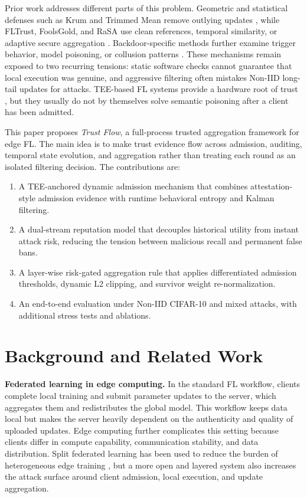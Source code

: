\documentclass[runningheads,orivec]{llncs}
\newenvironment{tightenumerate}{%
  \begin{enumerate}\setlength{\itemsep}{1pt}\setlength{\parskip}{0pt}\setlength{\parsep}{0pt}}{\end{enumerate}}
\begin{document}
Prior work addresses different parts of this problem. Geometric and statistical defenses such as Krum and Trimmed Mean remove outlying updates \cite{blanchard2017krum,yin2018byzantine}, while FLTrust, FoolsGold, and RaSA use clean references, temporal similarity, or adaptive secure aggregation \cite{cao2021fltrust,fung2020foolsgold,wang2025rasa}. Backdoor-specific methods further examine trigger behavior, model poisoning, or collusion patterns \cite{bagdasaryan2020backdoor,wang2019neuralcleanse,flpurifier,roseagg,shieldfl}. These mechanisms remain exposed to two recurring tensions: static software checks cannot guarantee that local execution was genuine, and aggressive filtering often mistakes Non-IID long-tail updates for attacks. TEE-based FL systems provide a hardware root of trust \cite{zhang2025rppfl,r1_tee_integrity,r5_tee_mitigating,xu2021distributed,lu2025tmt}, but they usually do not by themselves solve semantic poisoning after a client has been admitted.

This paper proposes \emph{Trust Flow}, a full-process trusted aggregation framework for edge FL. The main idea is to make trust evidence flow across admission, auditing, temporal state evolution, and aggregation rather than treating each round as an isolated filtering decision. The contributions are:
\begin{tightenumerate}
    \item A TEE-anchored dynamic admission mechanism that combines attestation-style admission evidence with runtime behavioral entropy and Kalman filtering.
    \item A dual-stream reputation model that decouples historical utility from instant attack risk, reducing the tension between malicious recall and permanent false bans.
    \item A layer-wise risk-gated aggregation rule that applies differentiated admission thresholds, dynamic L2 clipping, and survivor weight re-normalization.
    \item An end-to-end evaluation under Non-IID CIFAR-10 and mixed attacks, with additional stress tests and ablations.
\end{tightenumerate}

\section{Background and Related Work}

\textbf{Federated learning in edge computing.} In the standard FL workflow, clients complete local training and submit parameter updates to the server, which aggregates them and redistributes the global model. This workflow keeps data local but makes the server heavily dependent on the authenticity and quality of uploaded updates. Edge computing further complicates this setting because clients differ in compute capability, communication stability, and data distribution. Split federated learning has been used to reduce the burden of heterogeneous edge training \cite{parallelsfl}, but a more open and layered system also increases the attack surface around client admission, local execution, and update aggregation.
\end{document}
